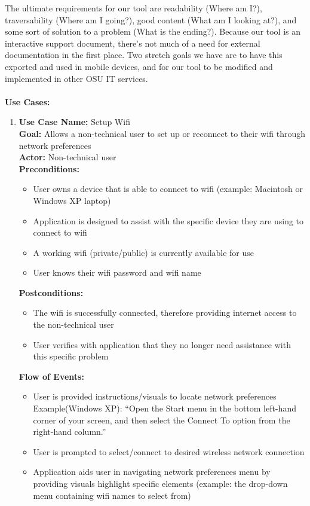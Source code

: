 \documentclass[12pt, letterpaper]{article}
\begin{document}
	The ultimate requirements for our tool are readability (Where am I?), traversability (Where am I going?), good content (What am I looking at?), and some sort of solution to a problem (What is the ending?). Because our tool is an interactive support document, there’s not much of a need for external documentation in the first place. Two stretch goals we have are to have this exported and used in mobile devices, and for our tool to be modified and implemented in other OSU IT services.
	\\\\\textbf{Use Cases:}
	
\begin{enumerate}
	\item \textbf{Use Case Name:} Setup Wifi
	\\\textbf{Goal:} Allows a non-technical user to set up or reconnect to their wifi through network preferences
	\\\textbf{Actor:} Non-technical user
	\\\textbf{Preconditions:}
	\begin{itemize}
		\item User owns a device that is able to connect to wifi (example: Macintosh or Windows XP laptop)
		\item Application is designed to assist with the specific device they are using to connect to wifi
		\item A working wifi (private/public) is currently available for use 
		\item User knows their wifi password and wifi name
	\end{itemize}
	\textbf{Postconditions:}
	\begin{itemize}
		\item The wifi is successfully connected, therefore providing internet access to the non-technical user
		\item User verifies with application that they no longer need assistance with this specific problem 
	\end{itemize}
	\textbf{Flow of Events:}
	\begin{itemize}
		\item User is provided instructions/visuals to locate network preferences 
		Example(Windows XP): “Open the Start menu in the bottom left-hand corner of your screen, and then select the Connect To option from the right-hand column.”
		\item User is prompted to select/connect to desired wireless network connection 
		\item Application aids user in navigating network preferences menu by providing visuals highlight specific elements (example: the drop-down menu containing wifi names to select from)

\end{itemize}
\end{enumerate}
\end{document}
